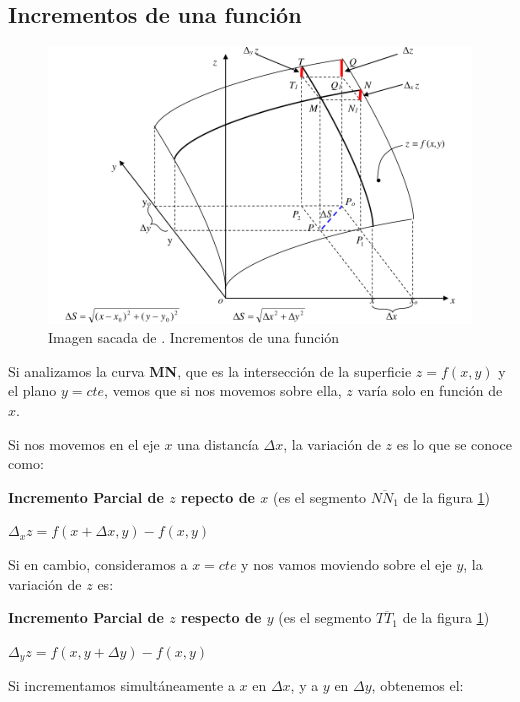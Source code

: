\documentclass[12pt]{article}
\begin{document}
\subsection{Incrementos de una función}\label{sec:incrementos_func}
\begin{figure}[H]
	\centering
	\includegraphics[width=\linewidth]{imagenes/incrementos_de_funcion.png}
	\caption{Imagen sacada de \parencite{am2monllor}. Incrementos de una función}
	\label{fig:inc_funcion}
\end{figure}

Si analizamos la curva \textbf{MN}, que es la intersección de la superficie $ z = f(x,y) $ y el plano $ y = cte $, vemos que si nos movemos sobre ella, $ z $ varía solo en función de $ x $.

Si nos movemos en el eje $ x $ una distancía $ \Delta x $, la variación de $ z $ es lo que se conoce como:

\textbf{Incremento Parcial de $ z $ repecto de $ x $} (es el segmento $\overline{NN_{1}}$ de la figura \ref{fig:inc_funcion})

\centerline{$\boxed{\Delta_{x}z = f(x+\Delta x, y) - f(x,y)}$}

\vspace{0.5cm}
Si en cambio, consideramos a $ x = cte $ y nos vamos moviendo sobre el eje $ y $, la variación de $ z $ es:

\textbf{Incremento Parcial de $ z $ respecto de $ y $} (es el segmento $ \overline{TT_{1}} $ de la figura \ref{fig:inc_funcion})

\centerline{$ \boxed{\Delta_{y}z = f(x, y + \Delta y) - f(x,y)} $}

\vspace{0.5cm}
Si incrementamos simultáneamente a $ x $ en $ \Delta x $, y a $ y $ en $ \Delta y $, obtenemos el:
\end{document}
